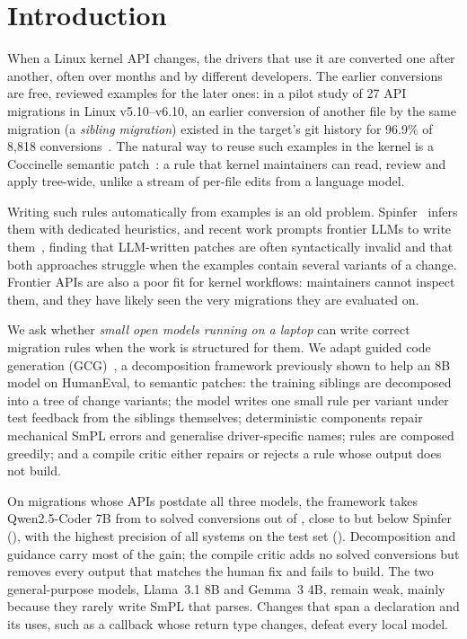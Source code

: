 \section{Introduction}
\label{sec:intro}

When a Linux kernel API changes, the drivers that use it are converted one after another, often over months and by
different developers. The earlier conversions are free, reviewed examples for the later ones: in a pilot study of
27 API migrations in Linux v5.10--v6.10, an earlier conversion of another file by the same migration (a
\emph{sibling migration}) existed in the target's git history for 96.9\% of 8{,}818 conversions~\cite{ahmed2026siblings}.
The natural way to reuse such examples in the kernel is a Coccinelle semantic patch~\cite{padioleau2008documenting}:
a rule that kernel maintainers can read, review and apply tree-wide, unlike a stream of per-file edits from a
language model.

Writing such rules automatically from examples is an old problem. Spinfer~\cite{serrano2020spinfer} infers them
with dedicated heuristics, and recent work prompts frontier LLMs to write them~\cite{yusuf2025howfar}, finding
that LLM-written patches are often syntactically invalid and that both approaches struggle when the examples
contain several variants of a change. Frontier APIs are also a poor fit for kernel workflows: maintainers cannot
inspect them, and they have likely seen the very migrations they are evaluated on.

We ask whether \emph{small open models running on a laptop} can write correct migration rules when the work is
structured for them. We adapt guided code generation (GCG)~\cite{almorsi2025gcg}, a decomposition framework
previously shown to help an 8B model on HumanEval, to semantic patches: the training siblings are decomposed into
a tree of change variants; the model writes one small rule per variant under test feedback from the siblings
themselves; deterministic components repair mechanical SmPL errors and generalise driver-specific names; rules are
composed greedily; and a compile critic either repairs or rejects a rule whose output does not build.

On \testMigrations{} migrations whose APIs postdate all three models, the framework takes Qwen2.5-Coder 7B from
\testQwenCoderOneShot{} to \testQwenCoderFull{} solved conversions out of \testBuildable{}, close to but below
Spinfer (\testSpinfer), with the highest precision of all systems on the test set
(\testSafeQwenCoderPrecision). Decomposition and guidance carry most of the gain; the compile critic adds no
solved conversions but removes every output that matches the human fix and fails to build. The two general-purpose
models, Llama~3.1 8B and Gemma~3 4B, remain weak, mainly because they rarely write SmPL that parses. Changes that
span a declaration and its uses, such as a callback whose return type changes, defeat every local model.

